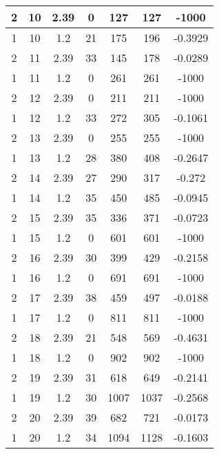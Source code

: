 \documentclass[letterpaper, 12pt]{article}
\begin{document}
\begin{longtable}{|c|c|c|c|c|c|c|}
\hline
2 & 10 & 2.39 & 0 & 127 & 127 & -1000 \\
\hline
1 & 10 & 1.2 & 21 & 175 & 196 & -0.3929 \\
\hline
2 & 11 & 2.39 & 33 & 145 & 178 & -0.0289 \\
\hline
1 & 11 & 1.2 & 0 & 261 & 261 & -1000 \\
\hline
2 & 12 & 2.39 & 0 & 211 & 211 & -1000 \\
\hline
1 & 12 & 1.2 & 33 & 272 & 305 & -0.1061 \\
\hline
2 & 13 & 2.39 & 0 & 255 & 255 & -1000 \\
\hline
1 & 13 & 1.2 & 28 & 380 & 408 & -0.2647 \\
\hline
2 & 14 & 2.39 & 27 & 290 & 317 & -0.272 \\
\hline
1 & 14 & 1.2 & 35 & 450 & 485 & -0.0945 \\
\hline
2 & 15 & 2.39 & 35 & 336 & 371 & -0.0723 \\
\hline
1 & 15 & 1.2 & 0 & 601 & 601 & -1000 \\
\hline
2 & 16 & 2.39 & 30 & 399 & 429 & -0.2158 \\
\hline
1 & 16 & 1.2 & 0 & 691 & 691 & -1000 \\
\hline
2 & 17 & 2.39 & 38 & 459 & 497 & -0.0188 \\
\hline
1 & 17 & 1.2 & 0 & 811 & 811 & -1000 \\
\hline
2 & 18 & 2.39 & 21 & 548 & 569 & -0.4631 \\
\hline
1 & 18 & 1.2 & 0 & 902 & 902 & -1000 \\
\hline
2 & 19 & 2.39 & 31 & 618 & 649 & -0.2141 \\
\hline
1 & 19 & 1.2 & 30 & 1007 & 1037 & -0.2568 \\
\hline
2 & 20 & 2.39 & 39 & 682 & 721 & -0.0173 \\
\hline
1 & 20 & 1.2 & 34 & 1094 & 1128 & -0.1603 \\
\hline
\end{longtable}
\end{document}
